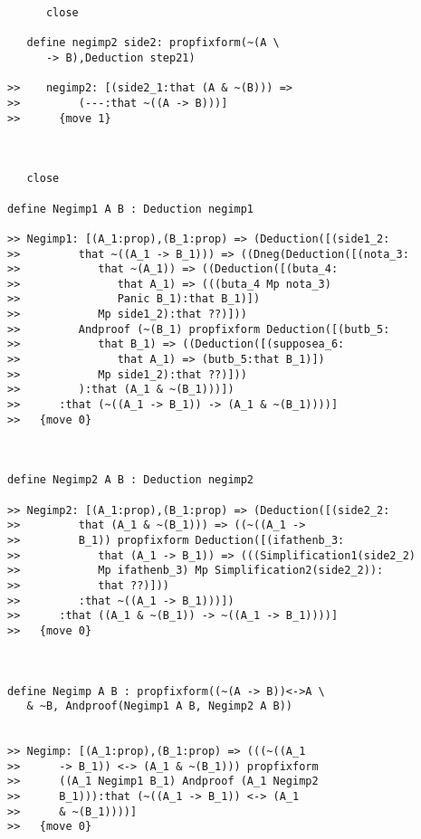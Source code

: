 \documentclass[12pt]{article}
\begin{document}
\begin{verbatim}
      close

   define negimp2 side2: propfixform(~(A \
      -> B),Deduction step21)

>>    negimp2: [(side2_1:that (A & ~(B))) =>
>>         (---:that ~((A -> B)))]
>>      {move 1}



   close

define Negimp1 A B : Deduction negimp1

>> Negimp1: [(A_1:prop),(B_1:prop) => (Deduction([(side1_2:
>>         that ~((A_1 -> B_1))) => ((Dneg(Deduction([(nota_3:
>>            that ~(A_1)) => ((Deduction([(buta_4:
>>               that A_1) => (((buta_4 Mp nota_3)
>>               Panic B_1):that B_1)])
>>            Mp side1_2):that ??)]))
>>         Andproof (~(B_1) propfixform Deduction([(butb_5:
>>            that B_1) => ((Deduction([(supposea_6:
>>               that A_1) => (butb_5:that B_1)])
>>            Mp side1_2):that ??)]))
>>         ):that (A_1 & ~(B_1)))])
>>      :that (~((A_1 -> B_1)) -> (A_1 & ~(B_1))))]
>>   {move 0}



define Negimp2 A B : Deduction negimp2

>> Negimp2: [(A_1:prop),(B_1:prop) => (Deduction([(side2_2:
>>         that (A_1 & ~(B_1))) => ((~((A_1 ->
>>         B_1)) propfixform Deduction([(ifathenb_3:
>>            that (A_1 -> B_1)) => (((Simplification1(side2_2)
>>            Mp ifathenb_3) Mp Simplification2(side2_2)):
>>            that ??)]))
>>         :that ~((A_1 -> B_1)))])
>>      :that ((A_1 & ~(B_1)) -> ~((A_1 -> B_1))))]
>>   {move 0}



define Negimp A B : propfixform((~(A -> B))<->A \
   & ~B, Andproof(Negimp1 A B, Negimp2 A B))


>> Negimp: [(A_1:prop),(B_1:prop) => (((~((A_1
>>      -> B_1)) <-> (A_1 & ~(B_1))) propfixform
>>      ((A_1 Negimp1 B_1) Andproof (A_1 Negimp2
>>      B_1))):that (~((A_1 -> B_1)) <-> (A_1
>>      & ~(B_1))))]
>>   {move 0}


\end{verbatim}
\end{document}
